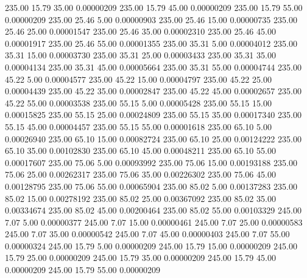     235.00     15.79     35.00     0.00000209
    235.00     15.79     45.00     0.00000209
    235.00     15.79     55.00     0.00000209
    235.00     25.46      5.00     0.00000903
    235.00     25.46     15.00     0.00000735
    235.00     25.46     25.00     0.00001547
    235.00     25.46     35.00     0.00002310
    235.00     25.46     45.00     0.00001917
    235.00     25.46     55.00     0.00001355
    235.00     35.31      5.00     0.00004012
    235.00     35.31     15.00     0.00003730
    235.00     35.31     25.00     0.00003433
    235.00     35.31     35.00     0.00004134
    235.00     35.31     45.00     0.00005664
    235.00     35.31     55.00     0.00004744
    235.00     45.22      5.00     0.00004577
    235.00     45.22     15.00     0.00004797
    235.00     45.22     25.00     0.00004439
    235.00     45.22     35.00     0.00002847
    235.00     45.22     45.00     0.00002657
    235.00     45.22     55.00     0.00003538
    235.00     55.15      5.00     0.00005428
    235.00     55.15     15.00     0.00015825
    235.00     55.15     25.00     0.00024809
    235.00     55.15     35.00     0.00017340
    235.00     55.15     45.00     0.00004457
    235.00     55.15     55.00     0.00001618
    235.00     65.10      5.00     0.00026940
    235.00     65.10     15.00     0.00082724
    235.00     65.10     25.00     0.00124222
    235.00     65.10     35.00     0.00102830
    235.00     65.10     45.00     0.00048211
    235.00     65.10     55.00     0.00017607
    235.00     75.06      5.00     0.00093992
    235.00     75.06     15.00     0.00193188
    235.00     75.06     25.00     0.00262317
    235.00     75.06     35.00     0.00226302
    235.00     75.06     45.00     0.00128795
    235.00     75.06     55.00     0.00065904
    235.00     85.02      5.00     0.00137283
    235.00     85.02     15.00     0.00278192
    235.00     85.02     25.00     0.00367092
    235.00     85.02     35.00     0.00334674
    235.00     85.02     45.00     0.00200464
    235.00     85.02     55.00     0.00103329
    245.00      7.07      5.00     0.00000377
    245.00      7.07     15.00     0.00000461
    245.00      7.07     25.00     0.00000583
    245.00      7.07     35.00     0.00000542
    245.00      7.07     45.00     0.00000403
    245.00      7.07     55.00     0.00000324
    245.00     15.79      5.00     0.00000209
    245.00     15.79     15.00     0.00000209
    245.00     15.79     25.00     0.00000209
    245.00     15.79     35.00     0.00000209
    245.00     15.79     45.00     0.00000209
    245.00     15.79     55.00     0.00000209
